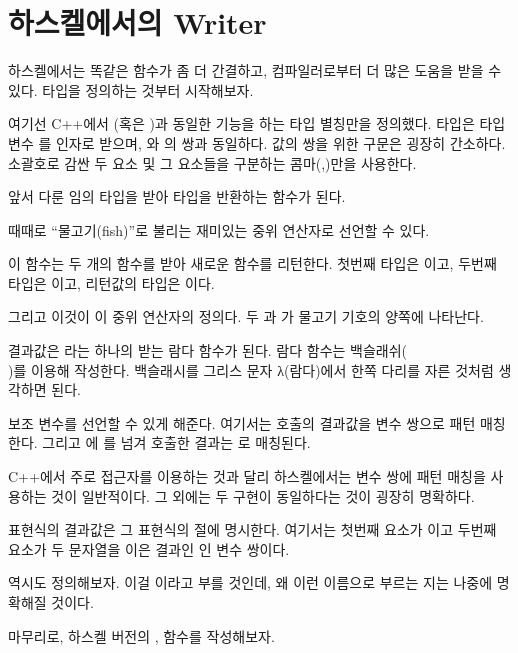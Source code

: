 \section{하스켈에서의 Writer}

하스켈에서는 똑같은 함수가 좀 더 간결하고, 컴파일러로부터 더 많은 도움을 받을 수 있다.  타입을 정의하는 것부터 시작해보자.

여기선 C++에서 (혹은 )과 동일한 기능을 하는 타입 별칭만을 정의했다.
 타입은 타입변수 를 인자로 받으며, 와 의 쌍과 동일하다.
값의 쌍을 위한 구문은 굉장히 간소하다. 소괄호로 감싼 두 요소 및 그 요소들을 구분하는 콤마(,)만을 사용한다.

앞서 다룬  임의 타입을 받아  타입을 반환하는 함수가 된다.

 때때로 ``물고기(fish)''로 불리는 재미있는 중위 연산자로 선언할 수 있다.

이 함수는 두 개의 함수를  받아 새로운 함수를 리턴한다.
첫번째  타입은 이고, 두번째  타입은 이고, 리턴값의 타입은 이다.

그리고 이것이 이 중위 연산자의 정의다. 두 \trArgument {} 과 가 물고기 기호의 양쪽에 나타난다.

결과값은 라는 하나의  받는 람다 함수가 된다. 람다 함수는 백슬래쉬(\\)를 이용해 작성한다. 백슬래시를 그리스 문자 λ(람다)에서 한쪽 다리를 자른 것처럼 생각하면 된다.

  보조 변수를 선언할 수 있게 해준다.
여기서는  호출의 결과값을  변수 쌍으로 패턴 매칭한다.
그리고 에 를 넘겨 호출한 결과는 로 매칭된다.

C++에서 주로 접근자를 이용하는 것과 달리 하스켈에서는 변수 쌍에 패턴 매칭을 사용하는 것이 일반적이다. 그 외에는 두 구현이 동일하다는 것이 굉장히 명확하다.

 표현식의 결과값은 그 표현식의  절에 명시한다. 여기서는 첫번째 요소가 이고 두번째 요소가 두 문자열을 이은 결과인 인 변수 쌍이다.

\trIdentityMorphism 역시도 정의해보자. 이걸 이라고 부를 것인데, 왜 이런 이름으로 부르는 지는 나중에 명확해질 것이다.

마무리로, 하스켈 버전의  ,  함수를 작성해보자.

